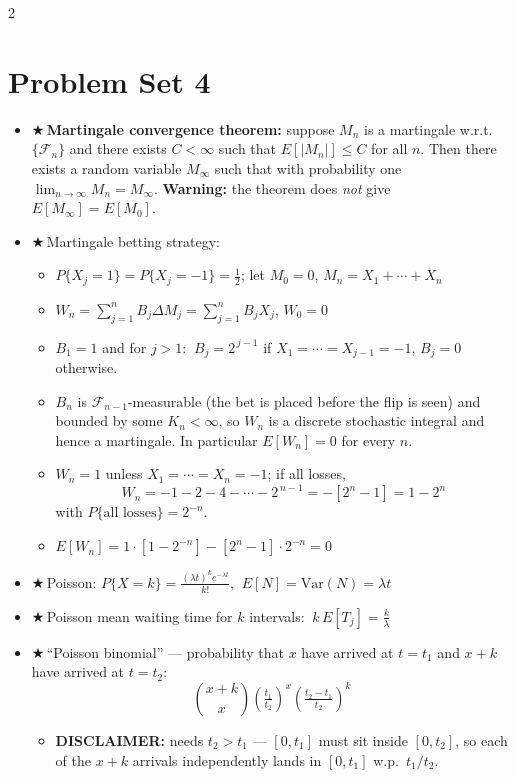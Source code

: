\documentclass[8pt,letterpaper]{extarticle}
\newcommand{\cs}{{\color{red!75!black}$\bigstar$}\,} %
\begin{document}
\begin{multicols}{2}
\section{Problem Set 4}
\begin{itemize}
  \item \cs \textbf{Martingale convergence theorem:} suppose $M_n$ is a martingale w.r.t.\ $\{\mathcal{F}_n\}$ and there exists $C<\infty$ such that $E[|M_n|]\le C$ for all $n$. Then there exists a random variable $M_\infty$ such that with probability one $\lim_{n\to\infty}M_n=M_\infty$. \textbf{Warning:} the theorem does \emph{not} give $E[M_\infty]=E[M_0]$.
  \item \cs Martingale betting strategy:
    \begin{itemize}
      \item $P\{X_j=1\}=P\{X_j=-1\}=\tfrac12$; let $M_0=0$, $M_n=X_1+\cdots+X_n$
      \item $W_n=\sum_{j=1}^{n}B_j\Delta M_j=\sum_{j=1}^{n}B_jX_j$, $W_0=0$
      \item $B_1=1$ and for $j>1$: $\ B_j=2^{\,j-1}$ if $X_1=\cdots=X_{j-1}=-1$, $B_j=0$ otherwise.
      \item $B_n$ is $\mathcal{F}_{n-1}$-measurable (the bet is placed before the flip is seen) and bounded by some $K_n<\infty$, so $W_n$ is a discrete stochastic integral and hence a martingale. In particular $E[W_n]=0$ for every $n$.
      \item $W_n=1$ unless $X_1=\cdots=X_n=-1$; if all losses,
        \[ W_n=-1-2-4-\cdots-2^{\,n-1}=-[2^n-1]=1-2^n \]
        with $P\{\text{all losses}\}=2^{-n}$.
      \item $E[W_n]=1\cdot[1-2^{-n}]-[2^n-1]\cdot 2^{-n}=0$
    \end{itemize}
  \item \cs Poisson: $P\{X=k\}=\frac{(\lambda t)^k e^{-\lambda t}}{k!}$, $\ E[N]=\mathrm{Var}(N)=\lambda t$
  \item \cs Poisson mean waiting time for $k$ intervals: $\ k\,E[T_j]=\frac{k}{\lambda}$
  \item \cs ``Poisson binomial'' --- probability that $x$ have arrived at $t=t_1$ and $x+k$ have arrived at $t=t_2$:
    \[ \binom{x+k}{x}\left(\tfrac{t_1}{t_2}\right)^{x}\left(\tfrac{t_2-t_1}{t_2}\right)^{k} \]
    \begin{itemize}
      \item \textbf{DISCLAIMER:} needs $t_2>t_1$ --- $[0,t_1]$ must sit inside $[0,t_2]$, so each of the $x+k$ arrivals independently lands in $[0,t_1]$ w.p.\ $t_1/t_2$.

\end{itemize}
\end{itemize}
\end{multicols}
\end{document}
